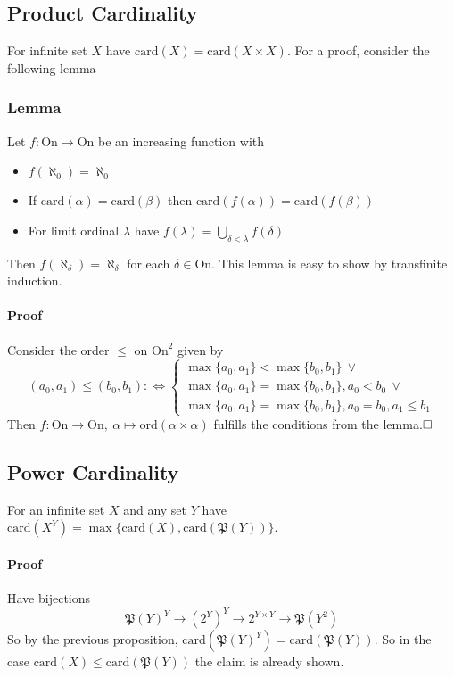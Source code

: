 \documentclass{scrartcl}
\begin{document}
\subsection{Product Cardinality}
For infinite set $X$ have $\mathrm{card}(X) = \mathrm{card}(X \times X)$. For a proof, consider the following lemma
\subsubsection{Lemma}
\label{aleph_identity_lemma}
Let $f: \mathrm{On} \to \mathrm{On}$ be an increasing function with
\begin{itemize}
    \item $f(\aleph_0) = \aleph_0$
    \item If $\mathrm{card}(\alpha) = \mathrm{card}(\beta)$ then $\mathrm{card}(f(\alpha)) = \mathrm{card}(f(\beta))$
    \item For limit ordinal $\lambda$ have $f(\lambda) = \bigcup_{\delta < \lambda} f(\delta)$
\end{itemize}
Then $f(\aleph_\delta) = \aleph_\delta$ for each $\delta \in \mathrm{On}$. This lemma is easy to show by transfinite induction.

\paragraph{Proof} Consider the order $\leq$ on $\mathrm{On}^2$ given by 
\begin{equation*}
    (a_0, a_1) \leq (b_0, b_1) :\Leftrightarrow \begin{cases} \max \{a_0,a_1\} < \max \{b_0,b_1\} \ \vee \\ \max \{a_0,a_1\} = \max \{b_0,b_1\}, a_0 < b_0 \ \vee \\ \max \{a_0,a_1\} = \max \{b_0,b_1\}, a_0 = b_0, a_1 \leq b_1 \end{cases}
\end{equation*}
Then $f: \mathrm{On} \to \mathrm{On}, \ \alpha \mapsto \mathrm{ord}(\alpha \times \alpha)$ fulfills the conditions from the lemma.$\hfill\square$

\subsection{Power Cardinality}
For an infinite set $X$ and any set $Y$ have $\mathrm{card}(X^Y) = \max \{ \mathrm{card}(X), \mathrm{card}(\mathfrak{P}(Y)) \}$. 
\paragraph{Proof} Have bijections
\begin{equation*}
    \mathfrak{P}(Y)^Y \to \left( 2^Y \right)^Y \to 2^{Y \times Y} \to \mathfrak{P}(Y^2)
\end{equation*}
So by the previous proposition, $\mathrm{card}(\mathfrak{P}(Y)^Y) = \mathrm{card}(\mathfrak{P}(Y))$. So in the case $\mathrm{card}(X) \leq \mathrm{card}(\mathfrak{P}(Y))$ the claim is already shown.
\end{document}
